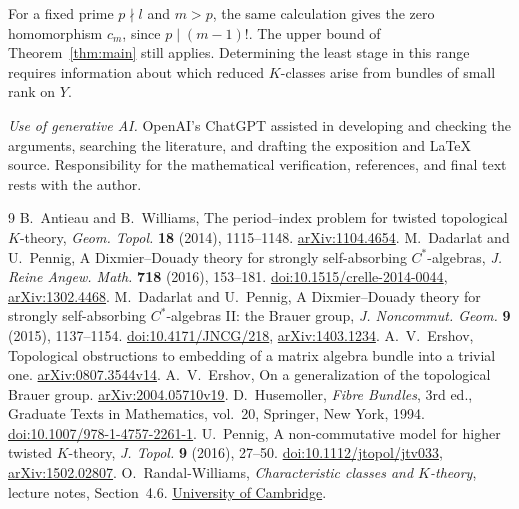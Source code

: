 \documentclass[11pt]{article}
\begin{document}
For a fixed prime \(p\nmid l\) and \(m>p\), the same calculation
gives the zero homomorphism \(c_m\), since \(p\mid(m-1)!\).
The upper bound of Theorem~\ref{thm:main} still applies. Determining
the least stage in this range requires information about which
reduced \(K\)-classes arise from bundles of small rank on \(Y\).

\clearpage
\noindent\textit{Use of generative AI.} OpenAI's ChatGPT assisted in developing and checking the arguments, searching the literature, and drafting the exposition and \LaTeX{} source. Responsibility for the mathematical verification, references, and final text rests with the author.

\begin{thebibliography}{9}
 B.~Antieau and B.~Williams, The period--index problem for twisted topological \(K\)-theory, \emph{Geom. Topol.} \textbf{18} (2014), 1115--1148. \href{https://arxiv.org/abs/1104.4654}{arXiv:1104.4654}.
 M.~Dadarlat and U.~Pennig, A Dixmier--Douady theory for strongly self-absorbing \(C^*\)-algebras, \emph{J. Reine Angew. Math.} \textbf{718} (2016), 153--181. \href{https://doi.org/10.1515/crelle-2014-0044}{doi:10.1515/crelle-2014-0044}, \href{https://arxiv.org/abs/1302.4468}{arXiv:1302.4468}.
 M.~Dadarlat and U.~Pennig, A Dixmier--Douady theory for strongly self-absorbing \(C^*\)-algebras II: the Brauer group, \emph{J. Noncommut. Geom.} \textbf{9} (2015), 1137--1154. \href{https://doi.org/10.4171/JNCG/218}{doi:10.4171/JNCG/218}, \href{https://arxiv.org/abs/1403.1234}{arXiv:1403.1234}.
 A.~V.~Ershov, Topological obstructions to embedding of a matrix algebra bundle into a trivial one. \href{https://arxiv.org/abs/0807.3544v14}{arXiv:0807.3544v14}.
 A.~V.~Ershov, On a generalization of the topological Brauer group. \href{https://arxiv.org/abs/2004.05710v19}{arXiv:2004.05710v19}.
 D.~Husemoller, \emph{Fibre Bundles}, 3rd ed., Graduate Texts in Mathematics, vol.~20, Springer, New York, 1994. \href{https://doi.org/10.1007/978-1-4757-2261-1}{doi:10.1007/978-1-4757-2261-1}.
 U.~Pennig, A non-commutative model for higher twisted \(K\)-theory, \emph{J. Topol.} \textbf{9} (2016), 27--50. \href{https://doi.org/10.1112/jtopol/jtv033}{doi:10.1112/jtopol/jtv033}, \href{https://arxiv.org/abs/1502.02807}{arXiv:1502.02807}.
 O.~Randal-Williams, \emph{Characteristic classes and \(K\)-theory}, lecture notes, Section~4.6. \href{https://www.dpmms.cam.ac.uk/~or257/teaching/notes/Kthy_short.pdf}{University of Cambridge}.
\end{thebibliography}
\end{document}
